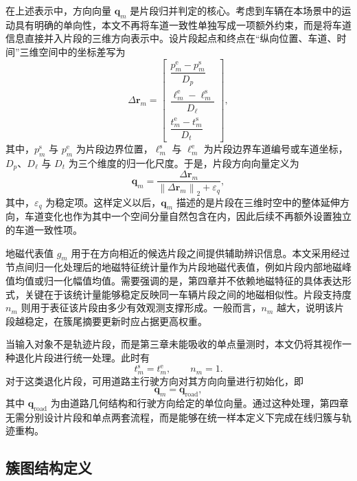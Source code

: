\documentclass{xdupgthesis}
\begin{document}
在上述表示中，方向向量 $\mathbf{q}_m$ 是片段归并判定的核心。考虑到车辆在本场景中的运动具有明确的单向性，本文不再将车道一致性单独写成一项额外约束，而是将车道信息直接并入片段的三维方向表示中。设片段起点和终点在“纵向位置、车道、时间”三维空间中的坐标差写为
\begin{equation}
	\Delta \mathbf{r}_m=
	\begin{bmatrix}
		\dfrac{p_m^{\mathrm{e}}-p_m^{\mathrm{s}}}{D_p}\\[8pt]
		\dfrac{\ell_m^{\mathrm{e}}-\ell_m^{\mathrm{s}}}{D_{\ell}}\\[8pt]
		\dfrac{t_m^{\mathrm{e}}-t_m^{\mathrm{s}}}{D_t}
	\end{bmatrix},
\end{equation}
其中，$p_m^{\mathrm{s}}$ 与 $p_m^{\mathrm{e}}$ 为片段边界位置，$\ell_m^{\mathrm{s}}$ 与 $\ell_m^{\mathrm{e}}$ 为片段边界车道编号或车道坐标，$D_p$、$D_{\ell}$ 与 $D_t$ 为三个维度的归一化尺度。于是，片段方向向量定义为
\begin{equation}
	\mathbf{q}_m=
	\frac{\Delta \mathbf{r}_m}{\left\|\Delta \mathbf{r}_m\right\|_2+\varepsilon_q},
\end{equation}
其中，$\varepsilon_q$ 为稳定项。这样定义以后，$\mathbf{q}_m$ 描述的是片段在三维时空中的整体延伸方向，车道变化也作为其中一个空间分量自然包含在内，因此后续不再额外设置独立的车道一致性项。

地磁代表值 $g_m$ 用于在方向相近的候选片段之间提供辅助辨识信息。本文采用经过节点间归一化处理后的地磁特征统计量作为片段地磁代表值，例如片段内部地磁峰值均值或归一化幅值均值。需要强调的是，第四章并不依赖地磁特征的具体表达形式，关键在于该统计量能够稳定反映同一车辆片段之间的地磁相似性。片段支持度 $n_m$ 则用于表征该片段由多少有效观测支撑形成。一般而言，$n_m$ 越大，说明该片段越稳定，在簇尾摘要更新时应占据更高权重。

当输入对象不是轨迹片段，而是第三章未能吸收的单点量测时，本文仍将其视作一种退化片段进行统一处理。此时有
\begin{equation}
	t_m^{\mathrm{s}}=t_m^{\mathrm{e}},\qquad n_m=1.
\end{equation}
对于这类退化片段，可用道路主行驶方向对其方向向量进行初始化，即
\begin{equation}
	\mathbf{q}_m=\mathbf{q}_{\mathrm{road}},
\end{equation}
其中 $\mathbf{q}_{\mathrm{road}}$ 为由道路几何结构和行驶方向给定的单位向量。通过这种处理，第四章无需分别设计片段和单点两套流程，而是能够在统一样本定义下完成在线归簇与轨迹重构。

\subsection{簇图结构定义}
\end{document}
